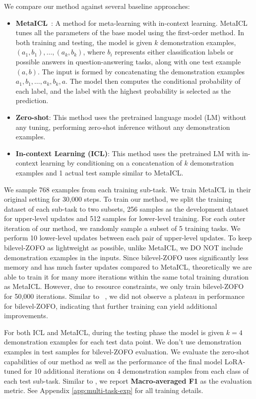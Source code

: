 We compare our method against several baseline approaches:
\begin{itemize}
    \item \textbf{MetaICL}~\citep{MinLZH22MetaICL}: A method for meta-learning with in-context learning. MetaICL tunes all the parameters of the base model using the first-order method. In both training and testing, the model is given $k$ demonstration examples, ${(a_1,b_1), \dots, (a_k,b_k)}$, where $b_i$ represents either classification labels or possible answers in question-answering tasks, along with one test example $(a,b)$. The input is formed by concatenating the demonstration examples $a_1,b_1, \dots, a_k,b_k,a$. The model then computes the conditional probability of each label, and the label with the highest probability is selected as the prediction.
    \item \textbf{Zero-shot}: This method uses the pretrained language model (LM) without any tuning, performing zero-shot inference without any demonstration examples.
    \item \textbf{In-context Learning (ICL)}: This method uses the pretrained LM with in-context learning by conditioning on a concatenation of $k$ demonstration examples and 1 actual test sample similar to MetaICL.
\end{itemize}

We sample 768 examples from each training sub-task. We train MetaICL in their original setting for 30,000 steps. To train our method, we split the training dataset of each sub-task to two subsets, 256 samples as the development dataset for upper-level updates and 512 samples for lower-level training. For each outer iteration of our method, we randomly sample a subset of 5 training tasks. We perform 10 lower-level updates between each pair of upper-level updates. To keep bilevel-ZOFO as lightweight as possible, unlike MetaICL, we DO NOT include demonstration examples in the inputs. Since bilevel-ZOFO uses significantly less memory and has much faster updates compared to MetaICL, theoretically we are able to train it for many more iterations within the same total training duration as MetaICL. However, due to resource constraints, we only train bilevel-ZOFO for 50,000 iterations. Similar to ~\cite{MalladiGNDL0A23Mezo}, we did not observe a plateau in performance for bilevel-ZOFO, indicating that further training can yield additional improvements. 

For both ICL and MetaICL, during the testing phase the model is given $k=4$ demonstration examples for each test data point. We don't use demonstration examples in test samples for bilevel-ZOFO evaluation. We evaluate the zero-shot capabilities of our method as well as the performance of the final model LoRA-tuned for 10 additional iterations on 4 demonstration samples from each class of each test sub-task. Similar to \cite{MinLZH22MetaICL}, we report \textbf{Macro-averaged F1} as the evaluation metric. See Appendix \ref{app:multi-task-exp} for all training details.

